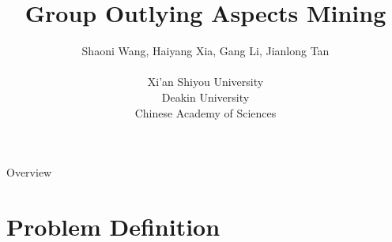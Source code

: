 \documentclass[
size=14pt,
paper=smartboard,  %
mode=present, 		%
display=slides, 	%
style=tuliplab,  	%
pauseslide,
fleqn,leqno]{powerdot}
\title{Group Outlying Aspects Mining}
\author{
	Shaoni Wang, Haiyang Xia, Gang Li, Jianlong Tan
	\\
	\\Xi'an Shiyou University
	\\Deakin University
	\\Chinese Academy of Sciences
}
\date{\gitCommitterDate}
\begin{document}
	\sloppy
	
	\maketitle
	
	\begin{slide}[toc=,bm=]{Overview}
		\tableofcontents[content=currentsection,type=1]
	\end{slide}
	
	
	\section{Problem Definition}
	
\end{document}
